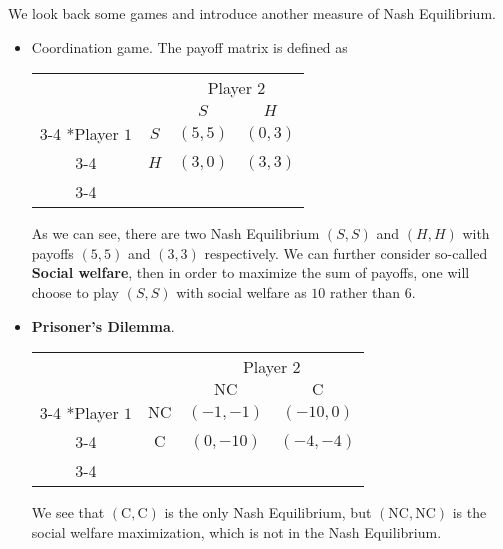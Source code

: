 \begin{prev}
	We look back some games and introduce another measure of Nash Equilibrium.
	\begin{itemize}
		\item Coordination game. The payoff matrix is defined as
		      \begin{table}[H]
			      \centering
			      \setlength{\extrarowheight}{2pt}
			      \begin{tabular}{cc|c|c|}
				                                & \multicolumn{1}{c}{} & \multicolumn{2}{c}{Player $2$}                           \\
				                                & \multicolumn{1}{c}{} & \multicolumn{1}{c}{$S$}        & \multicolumn{1}{c}{$H$} \\\cline{3-4}
				      \multirow{2}*{Player $1$} & $S$                  & $(5, 5)$                       & $(0, 3)$                \\\cline{3-4}
				                                & $H$                  & $(3, 0)$                       & $(3, 3)$                \\\cline{3-4}
			      \end{tabular}
		      \end{table}
		      As we can see, there are two Nash Equilibrium \((S, S)\) and \((H, H)\) with payoffs \((5, 5)\) and \((3, 3)\) respectively. We can
		      further consider so-called \textbf{Social welfare}, then in order to maximize the sum of
		      payoffs, one will choose to play \((S, S)\) with social welfare as \(10\) rather than \(6\).
		\item \textbf{Prisoner's Dilemma}.
		      \begin{table}[H]
			      \centering
			      \setlength{\extrarowheight}{2pt}
			      \begin{tabular}{cc|c|c|}
				                                & \multicolumn{1}{c}{} & \multicolumn{2}{c}{Player $2$}                                       \\
				                                & \multicolumn{1}{c}{} & \multicolumn{1}{c}{$\mathrm{NC}$} & \multicolumn{1}{c}{$\mathrm{C}$} \\\cline{3-4}
				      \multirow{2}*{Player $1$} & $\mathrm{NC}$        & $(-1, -1)$                        & $(-10, 0)$                       \\\cline{3-4}
				                                & $\mathrm{C}$         & $(0, -10)$                        & $(-4, -4)$                       \\\cline{3-4}
			      \end{tabular}
		      \end{table}
		      We see that \((\mathrm{C} , \mathrm{C} )\) is the only Nash Equilibrium, but \((\mathrm{NC} , \mathrm{NC} )\) is the social welfare maximization, which is not in
		      the Nash Equilibrium.
	\end{itemize}
\end{prev}

